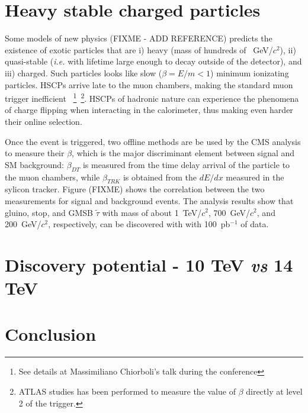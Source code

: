 \documentclass{cimento}
\begin{document}
\section{Heavy stable charged particles} \label{HSCP}
Some models of new physics (FIXME - ADD REFERENCE) 
predicts the existence of exotic particles that are 
i) heavy (mass of hundreds of ~GeV/$c^2$), ii) quasi-stable 
({\it i.e.} with lifetime large enough to decay outside of the detector), 
and iii) charged. Such particles looks like slow ($\beta=E/m<1$) 
minimum ionizating particles. 
HSCPs arrive late to the muon chambers, making the 
standard muon trigger inefficient
~\footnote{See details at Massimiliano Chiorboli's 
talk during the conference
}~\footnote{ATLAS studies has been performed to measure 
the value of $\beta$ directly at level 2 of the trigger.}. 
HSCPs of hadronic nature can experience the phenomena 
of charge flipping when interacting in the calorimeter, 
thus making even harder their online selection.

Once the event is triggered, two offline methods are be used by the 
CMS analysis to measure their $\beta$, 
which is the major discriminant element between signal and SM background:
$\beta_{DT}$ is measured from the time delay arrival of the particle
to the muon chambers, while $\beta_{TRK}$ is obtained 
from the $dE/dx$ measured in the sylicon tracker.
Figure (FIXME) shows the correlation between the two measurements 
for signal and background events. 
The analysis results show that gluino, stop, and GMSB $\tilde{\tau}$  
with mass of about 1~TeV/$c^2$, 700~GeV/$c^2$, and 200~GeV/$c^2$, 
respectively, can be discovered with with 100~pb$^{-1}$ of data.

\section{Discovery potential - 10 TeV {\it vs} 14 TeV} \label{10TeVvs14TeV}

\section{Conclusion} \label{Conclusion}







\end{document}

